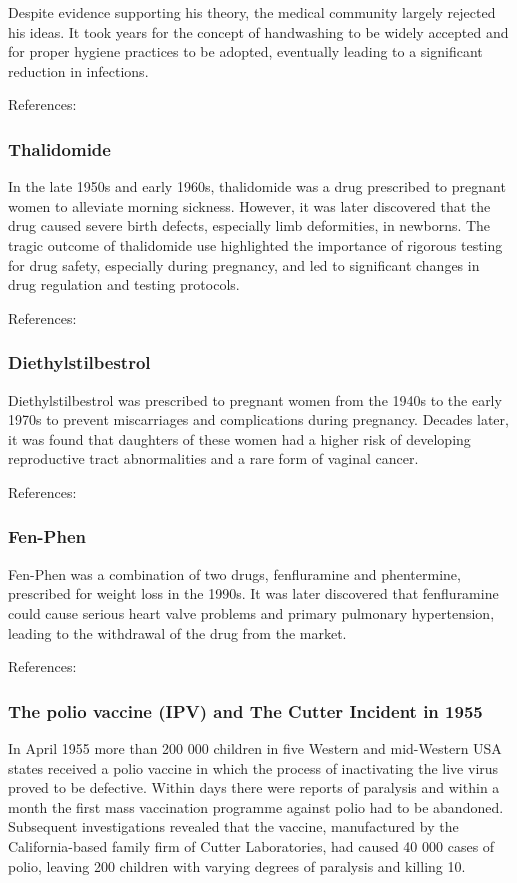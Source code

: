 Despite evidence supporting his theory, the medical community largely rejected his ideas. It took years for the concept of handwashing to be widely accepted and for proper hygiene practices to be adopted, eventually leading to a significant reduction in infections.

References: \cite{Semmelweis2006}

\subsubsection{Thalidomide}
In the late 1950s and early 1960s, thalidomide was a drug prescribed to pregnant women to alleviate morning sickness. However, it was later discovered that the drug caused severe birth defects, especially
limb deformities, in newborns. The tragic outcome of thalidomide use highlighted the importance of rigorous testing for drug safety, especially during pregnancy, and led to significant changes in drug
regulation and testing protocols.

References: \cite{WGMcbride}

\subsubsection{Diethylstilbestrol}
Diethylstilbestrol was prescribed to pregnant women from the 1940s to the early 1970s to prevent miscarriages and complications during pregnancy. Decades later, it was found that daughters of these women
had a higher risk of developing reproductive tract abnormalities and a rare form of vaginal cancer.

References: \cite{Diethylstilbestrol2000}

\subsubsection{Fen-Phen}
Fen-Phen was a combination of two drugs, fenfluramine and phentermine, prescribed for weight loss in the 1990s. It was later discovered that fenfluramine could cause serious heart valve problems and primary
pulmonary hypertension, leading to the withdrawal of the drug from the market.

References: \cite{Wolff1997}

\subsubsection{The polio vaccine (IPV) and The Cutter Incident in 1955}

In April 1955 more than 200 000 children in five Western and mid-Western USA states received a polio vaccine in which the process of inactivating the live virus proved to be defective. Within days there were reports of paralysis and within a month the first mass vaccination programme against polio had to be abandoned. Subsequent investigations revealed that the vaccine, manufactured by the California-based family firm of Cutter Laboratories, had caused 40 000 cases of polio, leaving 200 children with varying degrees of paralysis and killing 10.

